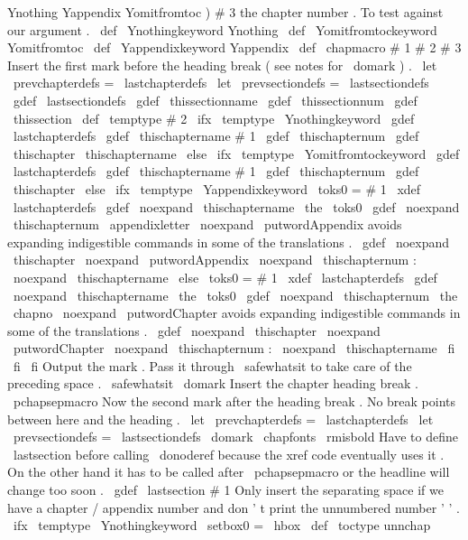 {{{{Ynothing
%
Yappendix
Yomitfromtoc
)
#
3
the
chapter
number
.
%
%
To
test
against
our
argument
.
\
def
\
Ynothingkeyword
{
Ynothing
}
\
def
\
Yomitfromtockeyword
{
Yomitfromtoc
}
\
def
\
Yappendixkeyword
{
Yappendix
}
%
\
def
\
chapmacro
#
1
#
2
#
3
{
%
%
Insert
the
first
mark
before
the
heading
break
(
see
notes
for
\
domark
)
.
\
let
\
prevchapterdefs
=
\
lastchapterdefs
\
let
\
prevsectiondefs
=
\
lastsectiondefs
\
gdef
\
lastsectiondefs
{
\
gdef
\
thissectionname
{
}
\
gdef
\
thissectionnum
{
}
%
\
gdef
\
thissection
{
}
}
%
%
\
def
\
temptype
{
#
2
}
%
\
ifx
\
temptype
\
Ynothingkeyword
\
gdef
\
lastchapterdefs
{
\
gdef
\
thischaptername
{
#
1
}
\
gdef
\
thischapternum
{
}
%
\
gdef
\
thischapter
{
\
thischaptername
}
}
%
\
else
\
ifx
\
temptype
\
Yomitfromtockeyword
\
gdef
\
lastchapterdefs
{
\
gdef
\
thischaptername
{
#
1
}
\
gdef
\
thischapternum
{
}
%
\
gdef
\
thischapter
{
}
}
%
\
else
\
ifx
\
temptype
\
Yappendixkeyword
\
toks0
=
{
#
1
}
%
\
xdef
\
lastchapterdefs
{
%
\
gdef
\
noexpand
\
thischaptername
{
\
the
\
toks0
}
%
\
gdef
\
noexpand
\
thischapternum
{
\
appendixletter
}
%
%
\
noexpand
\
putwordAppendix
avoids
expanding
indigestible
%
commands
in
some
of
the
translations
.
\
gdef
\
noexpand
\
thischapter
{
\
noexpand
\
putwordAppendix
{
}
\
noexpand
\
thischapternum
:
\
noexpand
\
thischaptername
}
%
}
%
\
else
\
toks0
=
{
#
1
}
%
\
xdef
\
lastchapterdefs
{
%
\
gdef
\
noexpand
\
thischaptername
{
\
the
\
toks0
}
%
\
gdef
\
noexpand
\
thischapternum
{
\
the
\
chapno
}
%
%
\
noexpand
\
putwordChapter
avoids
expanding
indigestible
%
commands
in
some
of
the
translations
.
\
gdef
\
noexpand
\
thischapter
{
\
noexpand
\
putwordChapter
{
}
\
noexpand
\
thischapternum
:
\
noexpand
\
thischaptername
}
%
}
%
\
fi
\
fi
\
fi
%
%
Output
the
mark
.
Pass
it
through
\
safewhatsit
to
take
care
of
%
the
preceding
space
.
\
safewhatsit
\
domark
%
%
Insert
the
chapter
heading
break
.
\
pchapsepmacro
%
%
Now
the
second
mark
after
the
heading
break
.
No
break
points
%
between
here
and
the
heading
.
\
let
\
prevchapterdefs
=
\
lastchapterdefs
\
let
\
prevsectiondefs
=
\
lastsectiondefs
\
domark
%
{
%
\
chapfonts
\
rmisbold
%
%
Have
to
define
\
lastsection
before
calling
\
donoderef
because
the
%
xref
code
eventually
uses
it
.
On
the
other
hand
it
has
to
be
called
%
after
\
pchapsepmacro
or
the
headline
will
change
too
soon
.
\
gdef
\
lastsection
{
#
1
}
%
%
%
Only
insert
the
separating
space
if
we
have
a
chapter
/
appendix
%
number
and
don
'
t
print
the
unnumbered
number
'
'
.
\
ifx
\
temptype
\
Ynothingkeyword
\
setbox0
=
\
hbox
{
}
%
\
def
\
toctype
{
unnchap
}}}}}}}
